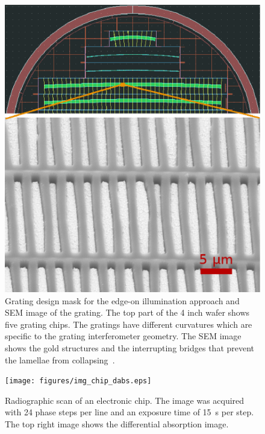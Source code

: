 \documentclass{pnastwo}
\begin{document}
\begin{figure}
    \includegraphics[width=.5\textwidth]{figures/grating_mask.eps}
    \caption{Grating design mask for
        the edge-on illumination approach and SEM
        image of the grating. The top part of the 4 inch wafer shows
        five grating chips. The
        gratings have different curvatures which are specific to the grating
        interferometer geometry. 
        The SEM image shows the gold structures and the interrupting bridges
        that prevent the lamellae from collapsing~\cite{Kenntner2010}.}
        \label{Fig:grating_mask}
\end{figure}

\begin{figure}
    \texttt{[image: figures/img\_chip\_dabs.eps]}
    \caption{Radiographic scan of an electronic chip. The image was acquired
        with 24 phase steps per line and an exposure time of \SI{15}{\second} per
    step. The top right image shows the differential absorption image.}
    \label{Fig:img_chip}
\end{figure}
\end{document}
